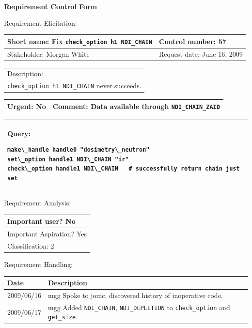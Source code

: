 \begin{center}\Large\bf
Requirement Control Form
\end{center}
\vspace{24pt}

Requirement Elicitation:

\begin{tabular}{|p{211pt}|p{211pt}|} \hline
Short name: Fix \texttt{check\_option h1 NDI\_CHAIN} & Control number: 57\\ \hline
Stakeholder: Morgan White & Request date: June 16, 2009\\
\end{tabular}
\begin{tabular}{|p{433pt}|} \hline
Description: \\ 
\texttt{check\_option h1 NDI\_CHAIN} never succeeds.\\
\hline
\end{tabular} 
\begin{tabular}{|p{211pt}|p{211pt}|} \hline
Urgent: No & Comment: Data available through \texttt{NDI\_CHAIN\_ZAID}
\\ \hline
\end{tabular}

\vspace{12pt}

\begin{tabular}{|p{433pt}|} \hline
Query:
\begin{verbatim}
make\_handle handle0 "dosimetry\_neutron"
set\_option handle1 NDI\_CHAIN "ir"
check\_option handle1 NDI\_CHAIN   # successfully return chain just set
\end{verbatim}
\\ \hline
\end{tabular}
\vspace{24pt}

Requirement Analysis:

\begin{tabular}{|p{433pt}|} \hline
Important user? No \\ \hline
Important Aspiration? Yes \\ \hline
Classification: 2 \\ \hline
\end{tabular}
\vspace{24pt}

Requirement Handling:

\begin{tabular}{|p{72pt}|p{351pt}|} \hline
Date & Description \\ \hline
2009/06/16 & mgg Spoke to jomc, discovered history of inoperative
code. \\ \hline
2009/06/17 & mgg Added \texttt{NDI\_CHAIN}, \texttt{NDI\_DEPLETION} to
\texttt{check\_option} and \texttt{get\_size}. \\ \hline
\end{tabular}
